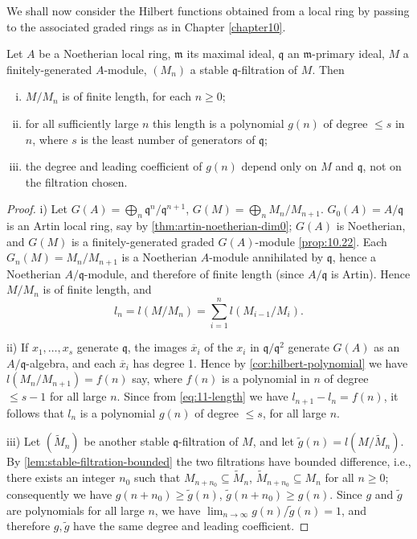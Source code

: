 We shall now consider the Hilbert functions obtained from a local ring by passing to the associated graded rings as in Chapter \ref{chapter10}.

\begin{proposition}\label{prop:local-hilbert}
Let $A$ be a Noetherian local ring, $\mathfrak{m}$ its maximal ideal, $\mathfrak{q}$ an $\mathfrak{m}$-primary ideal, $M$ a finitely-generated $A$-module, $(M_n)$ a stable $\mathfrak{q}$-filtration of $M$. Then
\begin{enumerate}[i)]
    \item $M/M_n$ is of finite length, for each $n \geq 0$;
    \item for all sufficiently large $n$ this length is a polynomial $g(n)$ of degree $\leq s$ in $n$, where $s$ is the least number of generators of $\mathfrak{q}$;
    \item the degree and leading coefficient of $g(n)$ depend only on $M$ and $\mathfrak{q}$, not on the filtration chosen.
\end{enumerate}
\end{proposition}

\begin{proof}
i) Let $G(A) = \bigoplus_n \mathfrak{q}^n/\mathfrak{q}^{n+1}$, $G(M) = \bigoplus_n M_n/M_{n+1}$. $G_0(A) = A/\mathfrak{q}$ is an Artin local ring, say by \eqref{thm:artin-noetherian-dim0}; $G(A)$ is Noetherian, and $G(M)$ is a finitely-generated graded $G(A)$-module \eqref{prop:10.22}. Each $G_n(M) = M_n/M_{n+1}$ is a Noetherian $A$-module annihilated by $\mathfrak{q}$, hence a Noetherian $A/\mathfrak{q}$-module, and therefore of finite length (since $A/\mathfrak{q}$ is Artin). Hence $M/M_n$ is of finite length, and
\begin{equation}\label{eq:11-length}
    l_n = l(M/M_n) = \sum_{i=1}^n l(M_{i-1}/M_i). \tag{1}
\end{equation}

ii) If $x_1, \ldots, x_s$ generate $\mathfrak{q}$, the images $\overline{x}_i$ of the $x_i$ in $\mathfrak{q}/\mathfrak{q}^2$ generate $G(A)$ as an $A/\mathfrak{q}$-algebra, and each $\overline{x}_i$ has degree 1. Hence by \eqref{cor:hilbert-polynomial} we have $l(M_n/M_{n+1}) = f(n)$ say, where $f(n)$ is a polynomial in $n$ of degree $\leq s - 1$ for all large $n$. Since from \eqref{eq:11-length} we have $l_{n+1} - l_n = f(n)$, it follows that $l_n$ is a polynomial $g(n)$ of degree $\leq s$, for all large $n$.

iii) Let $(\tilde{M}_n)$ be another stable $\mathfrak{q}$-filtration of $M$, and let $\tilde{g}(n) = l(M/\tilde{M}_n)$. By \eqref{lem:stable-filtration-bounded} the two filtrations have bounded difference, i.e., there exists an integer $n_0$ such that $M_{n+n_0} \subseteq \tilde{M}_n$, $\tilde{M}_{n+n_0} \subseteq M_n$ for all $n \geq 0$; consequently we have $g(n + n_0) \geq \tilde{g}(n)$, $\tilde{g}(n + n_0) \geq g(n)$. Since $g$ and $\tilde{g}$ are polynomials for all large $n$, we have $\lim_{n \to \infty} g(n)/\tilde{g}(n) = 1$, and therefore $g, \tilde{g}$ have the same degree and leading coefficient.
\end{proof}

